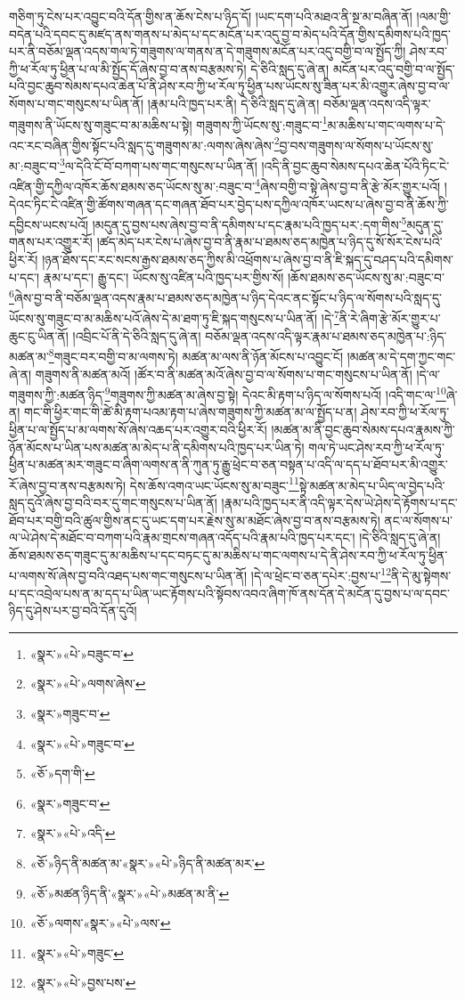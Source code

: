 གཅིག་ཏུ་ངེས་པར་འབྱུང་བའི་དོན་གྱིས་ན་ཆོས་ངེས་པ་ཉིད་དོ། །ཡང་དག་པའི་མཐའ་ནི་སྔ་མ་བཞིན་ནོ། །ལམ་གྱི་བདེན་པའི་དབང་དུ་མཛད་ནས་གནས་པ་མེད་པ་དང་མངོན་པར་འདུ་བྱ་བ་མེད་པའི་དོན་གྱིས་དམིགས་པའི་ཁྱད་པར་ནི་བཅོམ་ལྡན་འདས་གལ་ཏེ་གཟུགས་ལ་གནས་ན་དེ་གཟུགས་མངོན་པར་འདུ་བགྱི་བ་ལ་སྤྱོད་ཀྱི། ཤེས་རབ་ཀྱི་ཕ་རོལ་ཏུ་ཕྱིན་པ་ལ་མི་སྤྱོད་དོ་ཞེས་བྱ་བ་ནས་བརྩམས་ཏེ། དེ་ཅིའི་སླད་དུ་ཞེ་ན། མངོན་པར་འདུ་བགྱི་བ་ལ་སྤྱོད་པའི་བྱང་ཆུབ་སེམས་དཔའ་ཆེན་པོ་ནི་ཤེས་རབ་ཀྱི་ཕ་རོལ་ཏུ་ཕྱིན་པས་ཡོངས་སུ་ཟིན་པར་མི་འགྱུར་ཞེས་བྱ་བ་ལ་སོགས་པ་གང་གསུངས་པ་ཡིན་ནོ། །རྣམ་པའི་ཁྱད་པར་ནི། དེ་ཅིའི་སླད་དུ་ཞེ་ན། བཅོམ་ལྡན་འདས་འདི་ལྟར་གཟུགས་ནི་ཡོངས་སུ་གཟུང་བ་མ་མཆིས་པ་སྟེ། གཟུགས་ཀྱི་ཡོངས་སུ་:གཟུང་བ་\footnote{«སྣར་»«པེ་»བཟུང་བ་}མ་མཆིས་པ་གང་ལགས་པ་དེ་འང་རང་བཞིན་གྱིས་སྟོང་པའི་སླད་དུ་གཟུགས་མ་:ལགས་ཞེས་ཞེས་\footnote{«སྣར་»«པེ་»ལགས་ཞེས་}བྱ་བས་གཟུགས་ལ་སོགས་པ་ཡོངས་སུ་མ་:བཟུང་བ་\footnote{«སྣར་»གཟུང་བ་}ལ་དེའི་ངོ་བོ་བཀག་པས་གང་གསུངས་པ་ཡིན་ནོ། །འདི་ནི་བྱང་ཆུབ་སེམས་དཔའ་ཆེན་པོའི་ཏིང་ངེ་འཛིན་གྱི་དཀྱིལ་འཁོར་ཆོས་ཐམས་ཅད་ཡོངས་སུ་མ་:བཟུང་བ་\footnote{«སྣར་»«པེ་»གཟུང་བ་}ཞེས་བགྱི་བ་སྟེ་ཞེས་བྱ་བ་ནི་རྩེ་མོར་གྱུར་པའོ། །དེའང་ཏིང་ངེ་འཛིན་གྱི་ཚོགས་གཞན་དང་གཞན་ཐོབ་པར་བྱེད་པས་དཀྱིལ་འཁོར་ཡངས་པ་ཞེས་བྱ་བ་ནི་ཆོས་ཀྱི་དབྱིངས་ཡངས་པའོ། །མདུན་དུ་བྱས་པས་ཞེས་བྱ་བ་ནི་དམིགས་པ་དང་རྣམ་པའི་ཁྱད་པར་:དག་གིས་\footnote{«ཅོ་»དག་གི་}མདུན་དུ་གནས་པར་འགྱུར་རོ། །ཚད་མེད་པར་ངེས་པ་ཞེས་བྱ་བ་ནི་རྣམ་པ་ཐམས་ཅད་མཁྱེན་པ་ཉིད་དུ་སོ་སོར་ངེས་པའི་ཕྱིར་རོ། །ཉན་ཐོས་དང་རང་སངས་རྒྱས་ཐམས་ཅད་ཀྱིས་མི་འཕྲོགས་པ་ཞེས་བྱ་བ་ནི་ཇི་སྐད་དུ་བཤད་པའི་དམིགས་པ་དང་། རྣམ་པ་དང་། རྒྱུ་དང་། ཡོངས་སུ་འཛིན་པའི་ཁྱད་པར་གྱིས་སོ། །ཆོས་ཐམས་ཅད་ཡོངས་སུ་མ་:བཟུང་བ་\footnote{«སྣར་»གཟུང་བ་}ཞེས་བྱ་བ་ནི་བཅོམ་ལྡན་འདས་རྣམ་པ་ཐམས་ཅད་མཁྱེན་པ་ཉིད་དེའང་ནང་སྟོང་པ་ཉིད་ལ་སོགས་པའི་སླད་དུ་ཡོངས་སུ་གཟུང་བ་མ་མཆིས་པའོ་ཞེས་དེ་མ་ཐག་ཏུ་ཇི་སྐད་གསུངས་པ་ཡིན་ནོ། །དེ་\footnote{«སྣར་»«པེ་»འདི་}ནི་རེ་ཞིག་རྩེ་མོར་གྱུར་པ་ཆུང་ངུ་ཡིན་ནོ། །འབྲིང་པོ་ནི་དེ་ཅིའི་སླད་དུ་ཞེ་ན། བཅོམ་ལྡན་འདས་འདི་ལྟར་རྣམ་པ་ཐམས་ཅད་མཁྱེན་པ་:ཉིད་མཚན་མ་\footnote{«ཅོ་»ཉིད་ནི་མཚན་མ་«སྣར་»«པེ་»ཉིད་ནི་མཚན་མར་}གཟུང་བར་བགྱི་བ་མ་ལགས་ཏེ། མཚན་མ་ལས་ནི་ཉོན་མོངས་པ་འབྱུང་ངོ། །མཚན་མ་དེ་དག་ཀྱང་གང་ཞེ་ན། གཟུགས་ནི་མཚན་མའོ། །ཚོར་བ་ནི་མཚན་མའོ་ཞེས་བྱ་བ་ལ་སོགས་པ་གང་གསུངས་པ་ཡིན་ནོ། །དེ་ལ་གཟུགས་ཀྱི་:མཚན་ཉིད་\footnote{«ཅོ་»མཚན་ཉིད་ནི་«སྣར་»«པེ་»མཚན་མ་ནི་}གཟུགས་ཀྱི་མཚན་མ་ཞེས་བྱ་སྟེ། དེའང་མི་རྟག་པ་ཉིད་ལ་སོགས་པའོ། །འདི་གང་ལ་\footnote{«ཅོ་»ལགས་«སྣར་»«པེ་»ལས་}ཞེ་ན། གང་གི་ཕྱིར་གང་གི་ཚེ་མི་རྟག་པའམ་རྟག་པ་ཞེས་གཟུགས་ཀྱི་མཚན་མ་ལ་སྤྱོད་པ་ན། ཤེས་རབ་ཀྱི་ཕ་རོལ་ཏུ་ཕྱིན་པ་ལ་སྤྱོད་པ་མ་ལགས་སོ་ཞེས་འཆད་པར་འགྱུར་བའི་ཕྱིར་རོ། །མཚན་མ་ནི་བྱང་ཆུབ་སེམས་དཔའ་རྣམས་ཀྱི་ཉོན་མོངས་པ་ཡིན་པས་མཚན་མ་མེད་པ་ནི་དམིགས་པའི་ཁྱད་པར་ཡིན་ཏེ། གལ་ཏེ་ཡང་ཤེས་རབ་ཀྱི་ཕ་རོལ་ཏུ་ཕྱིན་པ་མཚན་མར་གཟུང་བ་ཞིག་ལགས་ན་ནི་ཀུན་ཏུ་རྒྱུ་ཕྲེང་བ་ཅན་བསྟན་པ་འདི་ལ་དད་པ་ཐོབ་པར་མི་འགྱུར་རོ་ཞེས་བྱ་བ་ནས་བརྩམས་ཏེ། དེས་ཆོས་འགའ་ཡང་ཡོངས་སུ་མ་བཟུང་\footnote{«སྣར་»«པེ་»གཟུང་}སྟེ་མཚན་མ་མེད་པ་ཡིད་ལ་བྱེད་པའི་སླད་དུའོ་ཞེས་བྱ་བའི་བར་དུ་གང་གསུངས་པ་ཡིན་ནོ། །རྣམ་པའི་ཁྱད་པར་ནི་འདི་ལྟར་དེས་ཡེ་ཤེས་དེ་རྟོགས་པ་དང་ཐོབ་པར་བགྱི་བའི་ཚུལ་གྱིས་ནང་དུ་ཡང་དག་པར་རྗེས་སུ་མ་མཐོང་ཞེས་བྱ་བ་ནས་བརྩམས་ཏེ། ནང་ལ་སོགས་པ་ལ་ཡེ་ཤེས་དེ་མཐོང་བ་བཀག་པའི་རྣམ་གྲངས་གཞན་འདོད་པའི་རྣམ་པའི་ཁྱད་པར་དང་། །དེ་ཅིའི་སླད་དུ་ཞེ་ན། ཆོས་ཐམས་ཅད་གཟུང་དུ་མ་མཆིས་པ་དང་བཏང་དུ་མ་མཆིས་པ་གང་ལགས་པ་དེ་ནི་ཤེས་རབ་ཀྱི་ཕ་རོལ་ཏུ་ཕྱིན་པ་ལགས་སོ་ཞེས་བྱ་བའི་འཐད་པས་གང་གསུངས་པ་ཡིན་ནོ། །དེ་ལ་ཕྲེང་བ་ཅན་དཔེར་:བྱས་པ་\footnote{«སྣར་»«པེ་»བྱས་པས་}ནི་དེ་མུ་སྟེགས་པ་དང་འབྲེལ་པས་ན་མ་དད་པ་ཡིན་ཡང་རྟོགས་པའི་སྟོབས་འབའ་ཞིག་ཁོ་ནས་དོན་དེ་མངོན་དུ་བྱས་པ་ལ་དབང་ཉིད་དུ་ཤེས་པར་བྱ་བའི་དོན་དུའོ། 